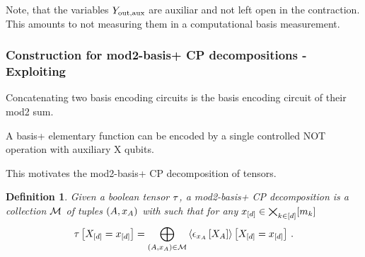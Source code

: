 \documentclass[aps,onecolumn,nofootinbib,pra]{article}
\newtheorem{lemma}{Lemma}
\newtheorem{definition}{Definition}
\begin{document}

    Note, that the variables $Y_{\mathrm{out},\mathrm{aux}}$ are auxiliar and not left open in the contraction.
    This amounts to not measuring them in a computational basis measurement.

    \subsubsection{Construction for mod2-basis+ CP decompositions - Exploiting \PolynomialSparsity{}}

    Concatenating two basis encoding circuits is the basis encoding circuit of their mod2 sum.

    A basis+ elementary function can be encoded by a single controlled NOT operation with auxiliary X qubits.

    This motivates the mod2-basis+ CP decomposition of tensors.

    \begin{definition}
        Given a boolean tensor $\tau$, a mod2-basis+ CP decomposition is a collection $\mathcal{M}$ of tuples $(A,x_{A})$ with such that for any $x_{[d]}\in\bigtimes_{k\in[d]}[m_{k}]$
        \begin{align*}
            \tau\left[X_{[d]}=x_{[d]}\right]
            = \bigoplus_{(A,x_{A})\in\mathcal{M}} \left\langle \epsilon_{x_{A}}\left[X_{A}\right]\right\rangle \left[ X_{[d]}=x_{[d]} \right] \, .
        \end{align*}
    \end{definition}
\end{document}

